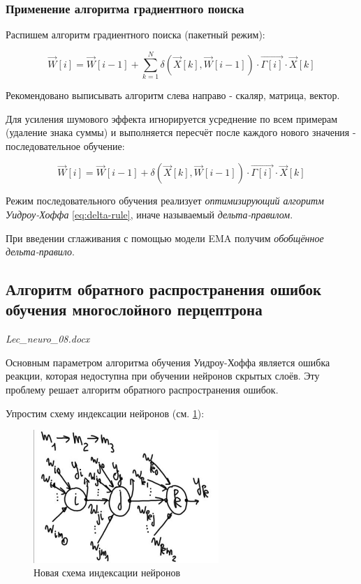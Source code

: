 \documentclass{article}
\numberwithin{equation}{subsection}
\begin{document}
\subsubsection{Применение алгоритма градиентного поиска}

Распишем алгоритм градиентного поиска (пакетный режим):

\begin{equation}
    \vec{W}[i] = \vec{W}[i-1] + \sum_{k=1}^{N} \delta(\vec{X}[k], \vec{W}[i-1])\cdot \vec{\Gamma[i]} \cdot \vec{X}[k]
\end{equation}

\begin{myquote}
    Рекомендовано выписывать алгоритм слева направо - скаляр, матрица, вектор.
\end{myquote}

Для усиления шумового эффекта игнорируется усреднение по всем примерам (удаление знака суммы) и выполняется 
пересчёт после каждого нового значения - последовательное обучение:

\begin{equation}
    \vec{W}[i] = \vec{W}[i-1] + \delta(\vec{X}[k], \vec{W}[i-1])\cdot \vec{\Gamma[i]} \cdot \vec{X}[k]
    \label{eq:delta-rule}
\end{equation}

Режим последовательного обучения реализует \textit{оптимизирующий алгоритм Уидроу-Хоффа} \ref{eq:delta-rule}, 
иначе называемый \textit{дельта-правилом}.

При введении сглаживания с помощью модели EMA получим \textit{обобщённое дельта-правило}.




\subsection{Алгоритм обратного распространения ошибок обучения многослойного перцептрона}

\begin{myquote}
    \textit{Lec\_neuro\_08.docx}
\end{myquote}

Основным параметром алгоритма обучения Уидроу-Хоффа является ошибка реакции, которая 
недоступна при обучении нейронов скрытых слоёв.
Эту проблему решает алгоритм обратного распространения ошибок.

Упростим схему индексации нейронов (см. \ref{hyperflat_10_1}):

\begin{figure}[htbp]
    \centering
    \includegraphics[width=7cm]{hyperflat_10_1.jpeg}
    \caption{Новая схема индексации нейронов}
    \label{hyperflat_10_1}
\end{figure}
\end{document}

